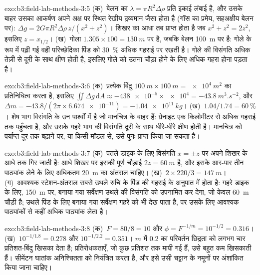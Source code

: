 \begin{solution}{exo:b3:field-lab-methods-3:5}
(क)~बेलन का $\lambda = \pi R^2\Delta\rho$ प्रति इकाई लंबाई है, और
उसके बाहर उसका आकर्षण अपने अक्ष पर स्थित रेखीय द्रव्यमान जैसा होता है (गॉस
का प्रमेय, सहअक्षीय बेलन पर): $\Delta g = 2G\pi R^2\Delta\rho\,z/(x^2
+ z^2)$। शिखर का आधा तब प्राप्त होता है जब $x^2 + z^2 = 2z^2$, इसलिए $z =
x_{1/2}$। (ख)~गोला $1.305\times100 = \qty{130}{m}$ पर है, जबकि
बेलन \qty{100}{m} पर है: गोले के रूप में पढ़ी गई वही परिच्छेदिका पिंड को
\qty{30}{\percent} अधिक गहराई पर रखती है। गोले की विसंगति अधिक तेज़ी से
दूरी के साथ क्षीण होती है, इसलिए गोले को उतना चौड़ा होने के लिए अधिक गहरा होना पड़ता है।
\end{solution}

\begin{solution}{exo:b3:field-lab-methods-3:6}
(क)~प्रत्येक बिंदु $\qty{100}{m}\times\qty{100}{m} =
\qty{e4}{m^2}$ का प्रतिनिधित्व करता है, इसलिए $\iint\Delta g\,\mathrm{d}A \approx
\num{-438e-5}\times\num{e4} = \qty{-43.8}{m^3.s^{-2}}$, और $\Delta m
= -43.8/(2\pi\times\num{6.674e-11}) = \qty{-1.04e11}{kg}$। (ख)~$1.04/1.74
= \qty{60}{\percent}$। शेष भाग विसंगति के उन पार्श्वों में है
जो मानचित्र के बाहर हैं: ग्रेनाइट एक किलोमीटर से अधिक गहराई तक पहुँचता है, और
उसके गहरे भाग की विसंगति दूरी के साथ धीरे-धीरे क्षीण होती है। मानचित्र को
पर्याप्त दूर तक बढ़ाने पर, या किसी मॉडल से, उसे पुनः प्राप्त किया जा सकता है।
\end{solution}

\begin{solution}{exo:b3:field-lab-methods-3:7}
(क)~पतले डाइक के लिए विसंगति $x = \pm z$ पर अपने शिखर के आधे तक गिर जाती है:
आधे शिखर पर इसकी पूर्ण चौड़ाई $2z = \qty{60}{m}$ है, और
इसके आर-पार तीन पाठ्यांक लेने के लिए अधिकतम \qty{20}{m} का अंतराल चाहिए। (ख)~$2\times
220/3 = \qty{147}{m}$। (ग)~आवश्यक स्टेशन-अंतराल सबसे उथले रुचि के पिंड की
गहराई के अनुपात में होता है: गहरे
डाइक के लिए, \qty{150}{m} पर, बनाया गया सर्वेक्षण उथले की विसंगति को उपनामित कर देगा, जो
केवल \qty{60}{m} चौड़ी है; उथले पिंड के लिए बनाया गया सर्वेक्षण गहरे को भी
देख पाता है, पर उसके लिए आवश्यक पाठ्यांकों से कहीं अधिक पाठ्यांक लेता है।
\end{solution}

\begin{solution}{exo:b3:field-lab-methods-3:8}
(क)~$F = 80/8 = 10$ और $\phi = F^{-1/m} = 10^{-1/2} = \num{0.316}$।
(ख)~$10^{-1/1.8} = \num{0.278}$ और $10^{-1/2.2} = \num{0.351}$।
$m$ में \num{0.2} का परिवर्तन छिद्रता को लगभग चार प्रतिशत-बिंदु खिसका देता है;
प्रतिरोधकताएँ, जो कुछ प्रतिशत तक मापी गई हैं, उसे बहुत कम खिसकाती हैं।
सीमेंटन घातांक अनिश्चितता को नियंत्रित करता है, और
इसे उसी चट्टान के नमूनों पर अंशांकित किया जाना चाहिए।
\end{solution}

